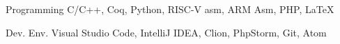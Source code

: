 

\begin{cvskills}

  \cvskill
    {Programming} %
    {C/C++, Coq, Python, RISC-V asm, ARM Asm, PHP, \LaTeX} %

  \cvskill
    {Dev. Env.} %
    {Visual Studio Code, IntelliJ IDEA, Clion, PhpStorm, Git, Atom} %

\end{cvskills}
